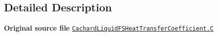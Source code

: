 \subsection{Detailed Description}
{\bfseries Original source file} \href{../../../home/carlo/data/GeN-Foam/GeN-Foam_ffn/GeN-Foam/GeN-Foam/classes/thermalHydraulics/src/physicsModels/heatTransferModels/FSHeatTransferCoefficientModels/subModels/postCHFModels/CachardLiquid/CachardLiquidFSHeatTransferCoefficient.C}{\tt Cachard\+Liquid\+F\+S\+Heat\+Transfer\+Coefficient.\+C} 